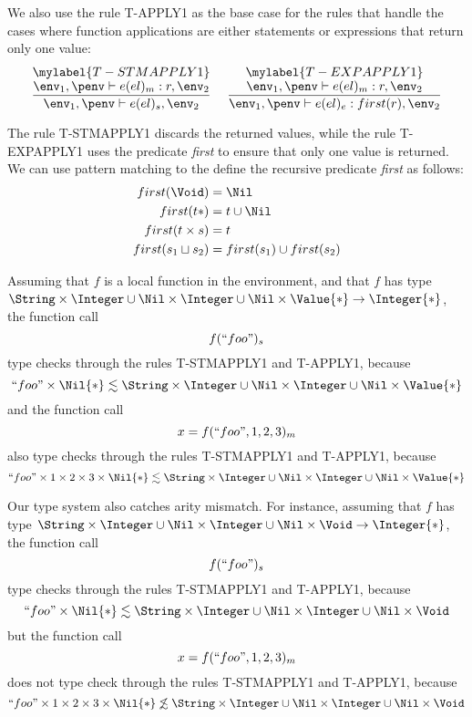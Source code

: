 We also use the rule \textsc{T-APPLY1} as the base case for the rules
that handle the cases where function applications are either statements
or expressions that return only one value:
\[
\begin{array}{c}
\begin{array}{c}
\mylabel{T-STMAPPLY1}\\
\dfrac{\env_{1}, \penv \vdash e(el)_{m}:r, \env_{2}}
      {\env_{1}, \penv \vdash e(el)_{s},\env_{2}}
\end{array}
\;
\begin{array}{c}
\mylabel{T-EXPAPPLY1}\\
\dfrac{\env_{1}, \penv \vdash e(el)_{m}:r, \env_{2}}
      {\env_{1}, \penv \vdash e(el)_{e}:first(r), \env_{2}}
\end{array}
\end{array}
\]

The rule \textsc{T-STMAPPLY1} discards the returned values,
while the rule \textsc{T-EXPAPPLY1} uses the predicate \emph{first} to
ensure that only one value is returned.
We can use pattern matching to the define the recursive predicate
\emph{first} as follows:
\begin{align*}
first(\Void) & = \Nil\\
first(t{*}) & = t \cup \Nil\\
first(t \times s) & = t\\
first(s_{1} \sqcup s_{2}) & = first(s_{1}) \cup first(s_{2})
\end{align*}

Assuming that $f$ is a local function in the environment, and that $f$ has type
$\String \times \Integer \cup \Nil \times \Integer \cup \Nil \times \Value{*} \rightarrow \Integer{*}$,
the function call
\[
f(``foo")_{s}
\]
type checks through the rules \textsc{T-STMAPPLY1} and \textsc{T-APPLY1}, because
\[
``foo" \times \Nil{*} \lesssim \String \times \Integer \cup \Nil \times \Integer \cup \Nil \times \Value{*}
\]
and the function call
\[
x = f(``foo",1,2,3)_{m}
\]
also type checks through the rules \textsc{T-STMAPPLY1} and \textsc{T-APPLY1}, because
\[
``foo" \times 1 \times 2 \times 3 \times \Nil{*} \lesssim \String \times \Integer \cup \Nil \times \Integer \cup \Nil \times \Value{*}
\]

Our type system also catches arity mismatch.
For instance, assuming that $f$ has type
$\String \times \Integer \cup \Nil \times \Integer \cup \Nil \times \Void \rightarrow \Integer{*}$,
the function call
\[
f(``foo")_{s}
\]
type checks through the rules \textsc{T-STMAPPLY1} and \textsc{T-APPLY1}, because
\[
``foo" \times \Nil{*} \lesssim \String \times \Integer \cup \Nil \times \Integer \cup \Nil \times \Void
\]
but the function call
\[
x = f(``foo",1,2,3)_{m}
\]
does not type check through the rules \textsc{T-STMAPPLY1} and \textsc{T-APPLY1}, because
\[
``foo" \times 1 \times 2 \times 3 \times \Nil{*} \not\lesssim \String \times \Integer \cup \Nil \times \Integer \cup \Nil \times \Void
\]

